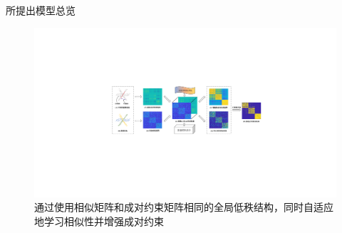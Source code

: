 \documentclass{beamer}
\begin{document}
\begin{frame}{所提出模型总览}

    \begin{figure}[htpb]
        \centering
        \includegraphics[width=1\linewidth]{pic/1.pdf}
        \caption{通过使用相似矩阵和成对约束矩阵相同的全局低秩结构，同时自适应地学习相似性并增强成对约束}
    \end{figure}

        
\end{frame}



\end{document}

